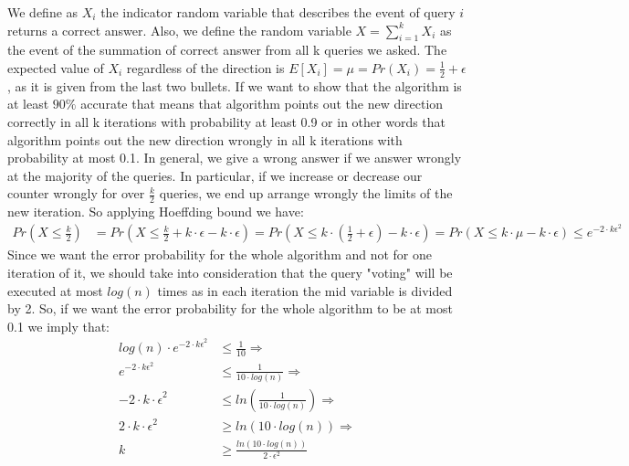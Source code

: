 \documentclass[11pt]{537homework}
\begin{document}
\subsubsection{}
We define as $X_i$ the indicator random variable that describes the event of query $i$ returns a correct answer. Also, we define the random variable $X = \sum_{i= 1}^{k} X_i$ as the event of the summation of correct answer from all k queries we asked. The expected value of $X_i$ regardless of the direction is $E[X_i] = \mu = Pr(X_i) = \frac{1}{2} + \epsilon$, as it is given from the last two bullets. If we want to show that the algorithm is at least $90\%$ accurate that means that algorithm points out the new direction correctly in all k iterations with probability at least 0.9 or in other words that algorithm points out the new direction wrongly in all k iterations with probability at most 0.1. In general, we give a wrong answer if we answer wrongly at the majority of the queries. In particular, if we increase or decrease our counter wrongly for over $\frac{k}{2}$ queries, we end up arrange wrongly the limits of the new iteration. So applying Hoeffding bound we have:
\begin{align*}
Pr(X \leq \frac{k}{2}) &= Pr(X \leq \frac{k}{2} +k\cdot \epsilon - k\cdot \epsilon)= Pr(X \leq k \cdot (\frac{1}{2} + \epsilon ) - k\cdot \epsilon) = Pr(X \leq k \cdot \mu - k\cdot \epsilon) \leq e^{{-2 \cdot k \epsilon}^2} 
\end{align*}
Since we want the error probability for the whole algorithm and not for one iteration of it, we should take into consideration that the query "voting" will be executed at most $log(n)$ times as in each iteration the mid variable is divided by 2. So, if we want the error probability for the whole algorithm to be at most 0.1 we imply that:
\begin{align*}
log(n) \cdot  e^{{-2 \cdot k \epsilon}^2} &\leq \frac{1}{10} \Longrightarrow \\
e^{{-2 \cdot k \epsilon}^2} &\leq \frac{1}{10 \cdot log(n)} \Longrightarrow \\
{-2 \cdot k \cdot \epsilon}^2 &\leq ln(\frac{1}{10 \cdot log(n)}) \Longrightarrow \\
{2 \cdot k \cdot \epsilon}^2 &\geq ln(10 \cdot log(n)) \Longrightarrow \\
k &\geq \frac{ln(10 \cdot log(n))}{2 \cdot \epsilon^2} 
\end{align*}
\end{document}
